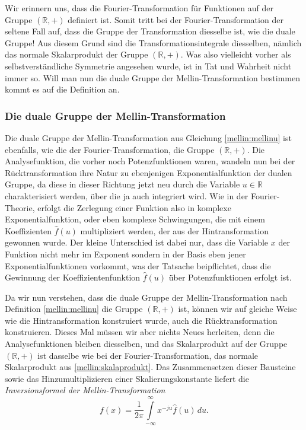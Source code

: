 Wir erinnern uns, dass die Fourier-Transformation für Funktionen auf der 
Gruppe $(\mathbb{R},+)$ definiert ist. 
Somit tritt bei der Fourier-Transformation der seltene Fall auf, dass die 
Gruppe der Transformation diesselbe ist, wie die duale Gruppe!
Aus diesem Grund sind die Transformationsintegrale diesselben, nämlich das 
normale Skalarprodukt der Gruppe $(\mathbb{R},+)$.
Was also vielleicht vorher als selbstverständliche Symmetrie angesehen 
wurde, ist in Tat und Wahrheit nicht immer so.
Will man nun die duale Gruppe der Mellin-Transformation bestimmen kommt 
es auf die Definition an. 

\subsubsection{Die duale Gruppe der Mellin-Transformation}
Die duale Gruppe der Mellin-Transformation aus Gleichung 
\eqref{mellin:mellinu} ist ebenfalls, wie die der Fourier-Transformation, 
die Gruppe $(\mathbb{R},+)$.
Die Analysefunktion, die vorher noch Potenzfunktionen waren, wandeln nun 
bei der Rücktransformation ihre Natur zu ebenjenigen Exponentialfunktion
der dualen Gruppe, da diese in dieser Richtung jetzt neu durch die Variable 
$u \in \mathbb{R}$ charakterisiert werden, über die ja auch integriert wird.
Wie in der Fourier-Theorie, erfolgt die Zerlegung einer Funktion also in 
komplexe Exponentialfunktion, oder eben komplexe Schwingungen, die mit 
einem Koeffizienten $\hat{f}(u)$ multipliziert werden, der aus der 
Hintransformation gewonnen wurde.
Der kleine Unterschied ist dabei nur, dass die Variable $x$ der Funktion 
nicht mehr im Exponent sondern in der Basis eben jener Exponentialfunktionen vorkommt, 
was der Tatsache beipflichtet, dass die Gewinnung der Koeffizientenfunktion 
$\hat{f}(u)$ über Potenzfunktionen erfolgt ist.

Da wir nun verstehen, dass die duale Gruppe der Mellin-Transformation nach 
Definition \eqref{mellin:mellinu} die Gruppe $(\mathbb{R},+)$ ist, können 
wir auf gleiche Weise wie die Hintransformation konstruiert wurde, auch 
die Rücktransformation konstruieren.
Dieses Mal müssen wir aber nichts Neues herleiten, denn die 
Analysefunktionen bleiben diesselben, und das Skalarprodukt auf der Gruppe 
$(\mathbb{R},+)$ ist dasselbe wie bei der Fourier-Transformation, das 
normale Skalarprodukt aus \eqref{mellin:skalaprodukt}. 
Das Zusammensetzen dieser Bausteine sowie das Hinzumultiplizieren einer 
Skalierungskonstante liefert die {\em Inversionsformel der Mellin-Transformation}
\begin{equation}
    f(x)
    = \frac{1}{2\pi} \int\limits_{-\infty}^{\infty} 
    x^{-ju} \hat{f}(u) \,{d}u
    .
    \label{mellin:mellininvu}
\end{equation}

